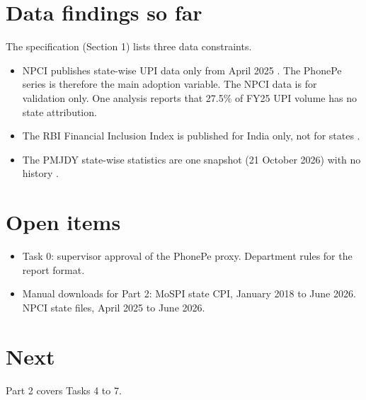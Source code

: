 \documentclass[11pt,a4paper]{article}
\begin{document}
\section{Data findings so far}
The specification (Section 1) lists three data constraints.
\begin{itemize}
\item NPCI publishes state-wise UPI data only from April 2025 \citep{npci_upi_state,medianama2025npci}. The PhonePe series is therefore the main adoption variable. The NPCI data is for validation only. One analysis \citep{dataful2026upi} reports that 27.5\% of FY25 UPI volume has no state attribution.
\item The RBI Financial Inclusion Index is published for India only, not for states \citep{rbi_fiindex2025}.
\item The PMJDY state-wise statistics are one snapshot (21 October 2026) with no history \citep{pmjdy_statewise}.
\end{itemize}

\section{Open items}
\begin{itemize}
\item Task 0: supervisor approval of the PhonePe proxy. Department rules for the report format.
\item Manual downloads for Part 2: MoSPI state CPI, January 2018 to June 2026. NPCI state files, April 2025 to June 2026.
\end{itemize}

\section{Next}
Part 2 covers Tasks 4 to 7.



\end{document}

